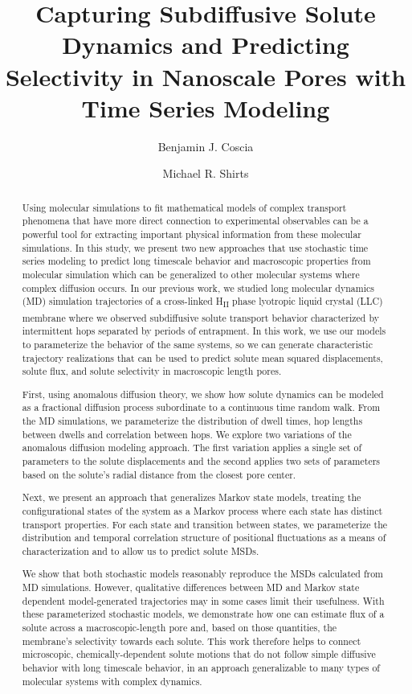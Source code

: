 \documentclass[journal=jctcce,manuscript=article]{achemso}
\title{Capturing Subdiffusive Solute Dynamics and Predicting Selectivity in Nanoscale Pores with Time Series Modeling}
\author{Benjamin J. Coscia}
\affiliation{Department of Chemical and Biological Engineering, University of Colorado Boulder, Boulder, CO 80309, USA}
\author{Michael R. Shirts}
\affiliation{Department of Chemical and Biological Engineering, University of Colorado Boulder, Boulder, CO 80309, USA}
\begin{document}
  
  \begin{abstract}

  Using molecular simulations to fit mathematical models of complex transport phenomena
  that have more direct connection to experimental observables can be a powerful tool
  for extracting important physical information from these molecular simulations. 
  In this study, we present two new approaches that use stochastic time series modeling
  to predict long timescale behavior and macroscopic properties from molecular 
  simulation which can be generalized to other molecular systems where complex 
  diffusion occurs. In our previous work, we studied long molecular dynamics (MD) 
  simulation trajectories of a cross-linked H\textsubscript{II} phase lyotropic liquid
  crystal (LLC) membrane where we observed subdiffusive solute transport behavior 
  characterized by intermittent hops separated by periods of entrapment. In this work,
  we use our models to parameterize the behavior of the same systems, so we can generate
  characteristic trajectory realizations that can be used to predict solute mean squared 
  displacements, solute flux, and solute selectivity in macroscopic length pores.

  First, using anomalous diffusion theory, we show how solute dynamics can be
  modeled as a fractional diffusion process subordinate to a continuous time 
  random walk. From the MD simulations, we parameterize the distribution of 
  dwell times, hop lengths between dwells and correlation between hops. We 
  explore two variations of the anomalous diffusion modeling approach. The first 
  variation applies a single set of parameters to the solute displacements and 
  the second applies two sets of parameters based on the solute's radial distance
  from the closest pore center. 

  Next, we present an approach that generalizes Markov state models, treating 
  the configurational states of the system as a Markov process where each 
  state has distinct transport properties. For each state and transition between
  states, we parameterize the distribution and temporal correlation structure of
  positional fluctuations as a means of characterization and to allow us to
  predict solute MSDs. 
 
  We show that both stochastic models reasonably reproduce the MSDs calculated 
  from MD simulations. However, qualitative differences between MD and Markov 
  state dependent model-generated trajectories may in some cases limit their 
  usefulness. With these parameterized stochastic models, we demonstrate how 
  one can estimate flux of a solute across a macroscopic-length pore and, based
  on those quantities, the membrane's selectivity towards each solute. This
  work therefore helps to connect microscopic, chemically-dependent solute 
  motions that do not follow simple diffusive behavior with long timescale 
  behavior, in an approach generalizable to many types of molecular systems 
  with complex dynamics.

  \end{abstract}
\end{document}
